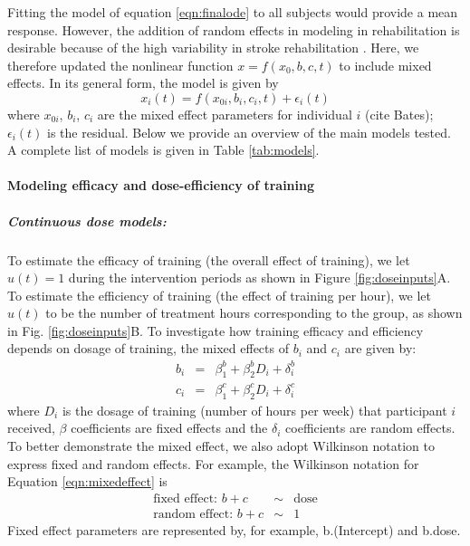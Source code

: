 Fitting the model of equation \ref{eqn:finalode} to all subjects would provide a mean response. 
However, the addition of random effects in modeling in rehabilitation is desirable because of the high variability in stroke rehabilitation \cite{Park2017}.
Here, we therefore updated the nonlinear function $ x=f(x_0,b,c,t) $ to include mixed effects. 
In its general form, the model is given by
\begin{equation}
	x_i(t) = f(x_{0i},b_i,c_i,t) + \epsilon_i (t)
\end{equation}
where $ x_{0i} $, $ b_i $, $ c_i $ are the mixed effect parameters for individual $ i $ (cite Bates); $ \epsilon_i (t) $ is the residual. 
Below we provide an overview of the main models tested. 
A complete list of models is given in Table \ref{tab:models}.

\paragraph{Modeling efficacy and dose-efficiency of training}
\subparagraph{Continuous dose models: } 
To estimate the efficacy of training (the overall effect of training), we let $ u(t)=1 $ during the intervention periods as shown in Figure \ref{fig:doseinputs}A. 
To estimate the efficiency of training (the effect of training per hour), we let $ u(t) $ to be the number of treatment hours corresponding to the group, as shown in Fig. \ref{fig:doseinputs}B.  
To investigate how training efficacy and efficiency depends on dosage of training, the mixed effects of $ b_i $ and $ c_i $ are given by:
\begin{eqnarray}\label{eqn:mixedeffect}
	b_i &=& \beta_1^b + \beta_2^b D_i + \delta_i^b   \nonumber \\
	c_i &=& \beta_1^c + \beta_2^c D_i + \delta_i^c   
\end{eqnarray}
where $ D_i $ is the dosage of training (number of hours per week) that participant $ i $ received, 
$ \beta $ coefficients are fixed effects and the $ \delta_i $ coefficients are random effects. 
To better demonstrate the mixed effect, we also adopt Wilkinson notation to express fixed and random effects. 
For example, the Wilkinson notation for Equation \ref{eqn:mixedeffect} is
\begin{eqnarray}
	\text{fixed effect: } b + c  &\sim& \text{dose} \\
	\text{random effect: } b + c &\sim& 1
\end{eqnarray}
Fixed effect parameters are represented by, for example, b.(Intercept) and b.dose.

